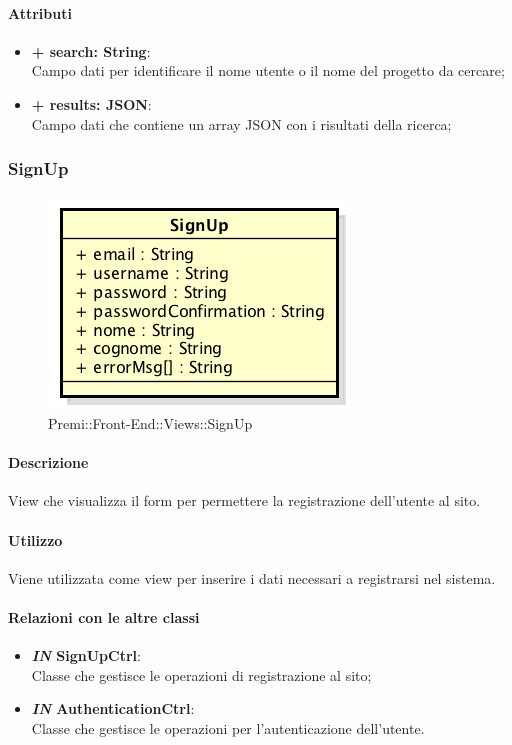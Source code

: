 	\paragraph{Attributi}
	\begin{itemize}
		\item \textbf{+ search: String}:\\
		Campo dati per identificare il nome utente o il nome del progetto da cercare;
		\item \textbf{+ results: JSON}:\\
		Campo dati che contiene un array JSON con i risultati della ricerca;
	\end{itemize}
\newpage
	
	
\subsubsection{SignUp}
	\begin{figure}[h]
		\centering
		\includegraphics[width=0.3\linewidth]{img/premi_front_end_views_signup}
		\caption[Premi::Front-End::Views::SignUp]{Premi::Front-End::Views::SignUp}
	\end{figure}
	
	\paragraph{Descrizione}
	View che visualizza il form per permettere la registrazione dell'utente al sito.
	
	\paragraph{Utilizzo}
	Viene utilizzata come view per inserire i dati necessari a registrarsi nel sistema.
	
	\paragraph{Relazioni con le altre classi}
	\begin{itemize}
		\item \textbf{\textit{IN} SignUpCtrl}:\\
		Classe che gestisce le operazioni di registrazione al sito;
		\item \textbf{\textit{IN} AuthenticationCtrl}:\\
		Classe che gestisce le operazioni per l'autenticazione dell'utente.
	\end{itemize}
	
